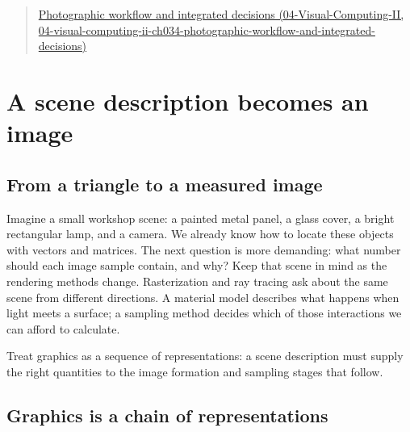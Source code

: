 \begin{quote}
\href{../04-Visual-Computing-II/main.pdf\#nameddest=04-visual-computing-ii-ch034-photographic-workflow-and-integrated-decisions}{Photographic workflow and integrated decisions (04-Visual-Computing-II, 04-visual-computing-ii-ch034-photographic-workflow-and-integrated-decisions)}
\end{quote}

\section{A scene description becomes an image}\label{03-visual-computing-i-ch001-a-scene-description-becomes-an-image}

\subsection{From a triangle to a measured image}\label{03-visual-computing-i-ch001-from-a-triangle-to-a-measured-image}

Imagine a small workshop scene: a painted metal panel, a glass cover, a bright rectangular lamp, and a camera. We already know how to locate these objects with vectors and matrices. The next question is more demanding: what number should each image sample contain, and why? Keep that scene in mind as the rendering methods change. Rasterization and ray tracing ask about the same scene from different directions. A material model describes what happens when light meets a surface; a sampling method decides which of those interactions we can afford to calculate.

Treat graphics as a sequence of representations: a scene description must supply the right quantities to the image formation and sampling stages that follow.

\subsection{Graphics is a chain of representations}\label{03-visual-computing-i-ch001-graphics-is-a-chain-of-representations}

